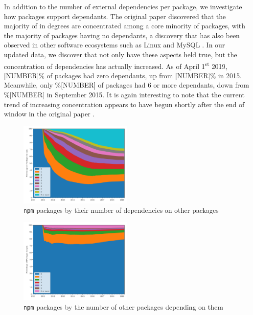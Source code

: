 \documentclass[10pt,conference]{IEEEtran}
\def\code#1{\texttt{#1}}
\begin{document}
In addition to the number of external dependencies per package, 
we investigate how packages support dependants. The original paper 
discovered that the majority of in degrees are concentrated among a core 
minority of packages, with the majority of packages having no dependants,
a discovery that has also been observed in other software ecosystems such
as Linux and MySQL \cite{Myers:2003}. In our updated data, we discover 
that not only have these aspects held true, but the concentration of 
dependencies has actually increased. As of April 1\textsuperscript{st} 2019, [NUMBER]\% of packages
had zero dependants, up from [NUMBER]\% in 2015. Meanwhile, only \%[NUMBER] of packages
had 6 or more dependants, down from \%[NUMBER] in September 2015. It is again interesting to note
that the current trend of increasing concentration appears to have begun shortly after the end of window in the original
paper \cite{Wittern:2016}.

\begin{figure}
  \includegraphics[width=0.5\textwidth]{figures/npm_deps_monthly_out_degree.pdf}
  \caption{\code{npm} packages by their number of dependencies on other packages}
  \label{outDegree}
\end{figure}

\begin{figure}
  \includegraphics[width=0.5\textwidth]{figures/npm_deps_monthly_in_degree.pdf}
  \caption{\code{npm} packages by the number of other packages depending on them}
  \label{inDegree}
\end{figure}
\end{document}

